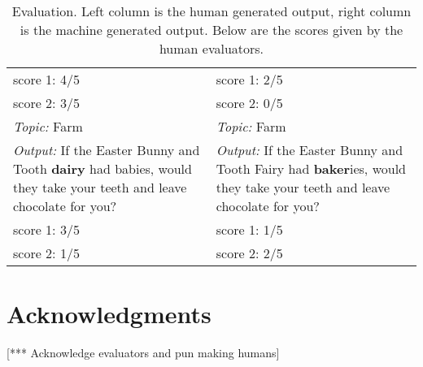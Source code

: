\documentclass[11pt,letterpaper]{article}
\begin{document}
\begin{table}
\begin{tabular}{|P{7cm}|P{7cm}|}
    score 1: 4/5            & score 1: 2/5\\
    score 2: 3/5            & score 2: 0/5          \\ \hline
    \textit{Topic:} Farm & \textit{Topic:} Farm \\
    \textit{Output:} If the Easter Bunny and Tooth \textbf{dairy} had babies, would they take your teeth and leave chocolate for you? & \textit{Output:} If the Easter Bunny and Tooth Fairy had \textbf{baker}ies, would they take your teeth and leave chocolate for you? \\
    score 1: 3/5            & score 1: 1/5\\
    score 2: 1/5            & score 2: 2/5          \\ \hline
  \end{tabular}
  \newline\newline
  \caption{Evaluation. Left column is the human generated output, right column is the machine generated output. Below are the scores given by the human evaluators.}\label{tab1}
\end{table}

\section*{Acknowledgments} 
[*** Acknowledge evaluators and pun making humans]



\end{document}
